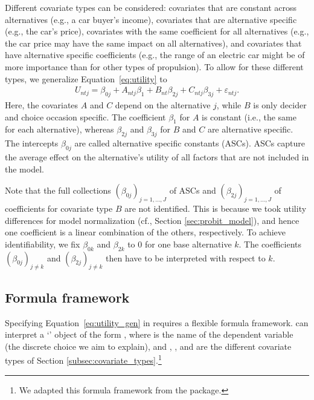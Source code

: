 \documentclass[article,shortnames]{jss}
\newcommand{\class}[1]{`\code{#1}'}
\begin{document}
Different covariate types can be considered: covariates that are constant across alternatives (e.g., a car buyer's income), covariates that are alternative specific (e.g., the car's price), covariates with the same coefficient for all alternatives (e.g., the car price may have the same impact on all alternatives), and covariates that have alternative specific coefficients (e.g., the range of an electric car might be of more importance than for other types of propulsion). To allow for these different types, we generalize Equation~\ref{eq:utility} to
%
\begin{align}
  \label{eq:utility_gen}
  U_{ntj} = \beta_{0j} + A_{ntj} \beta_1 + B_{nt} \beta_{2j} + C_{ntj} \beta_{3j} + \varepsilon_{ntj}.
\end{align}
%
Here, the covariates $A$ and $C$ depend on the alternative $j$, while $B$ is only decider and choice occasion specific. The coefficient $\beta_1$ for $A$ is constant (i.e., the same for each alternative), whereas $\beta_{2j}$ and $\beta_{3j}$ for $B$ and $C$ are alternative specific. The intercepts $\beta_{0j}$ are called alternative specific constants (ASCs). ASCs capture the average effect on the alternative's utility of all factors that are not included in the model.

Note that the full collections $(\beta_{0j})_{j=1,\dots,J}$ of ASCs and $(\beta_{2j})_{j=1,\dots,J}$ of coefficients for covariate type $B$ are not identified. This is because we took utility differences for model normalization (cf., Section \ref{sec:probit_model}), and hence one coefficient is a linear combination of the others, respectively. To achieve identifiability, we fix $\beta_{0k}$ and $\beta_{2k}$ to 0 for one base alternative $k$. The coefficients $(\beta_{0j})_{j\neq k}$ and $(\beta_{2j})_{j\neq k}$ then have to be interpreted with respect to $k$.

\subsection{Formula framework} \label{subsec:formula}

Specifying Equation~\ref{eq:utility_gen} in  requires a flexible formula framework.  can interpret a \class{formula} object of the form , where  is the name of the dependent variable (the discrete choice we aim to explain), and , , and  are the different covariate types of Section \ref{subsec:covariate_types}.\footnote{We adapted this formula framework from the  package.}
\end{document}
